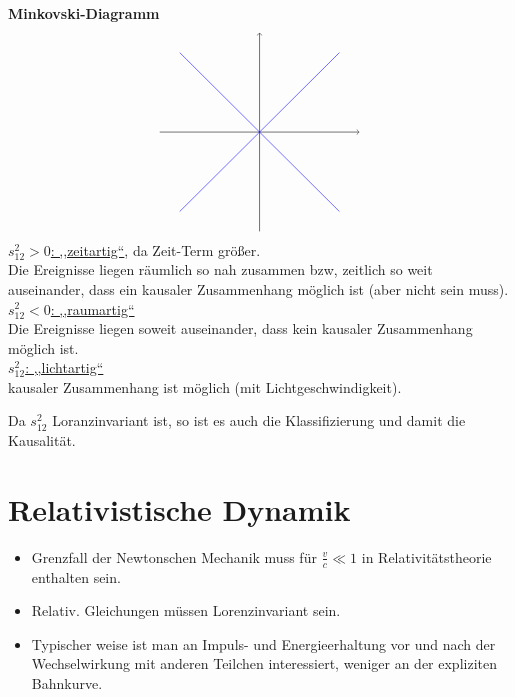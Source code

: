\documentclass[titlepage,12pt,a4paper,ngerman]{report}
\newcommand{\rbox}[1]{\begin{tcolorbox}[colback=white,colframe=red!75!black]#1\end{tcolorbox}} %
\begin{document}
{%

\textbf{Minkovski-Diagramm}\\
$$
\begin{tikzpicture}
\draw[->] (0,-2.5) -- (0,2.5);
\draw[->] (-2.5,0) -- (2.5,0);
\draw[draw=blue] (-2,-2) -- (2,2);
\draw[draw=blue] (-2,2) --(2,-2);
\end{tikzpicture}
$$
\underline{$ s_{12}^2>0 $: ,,zeitartig``}, da Zeit-Term größer.\\
Die Ereignisse liegen räumlich so nah zusammen bzw, zeitlich so weit auseinander, dass ein kausaler Zusammenhang möglich ist (aber nicht sein muss).\\[5pt]
\underline{$ s_{12}^2 < 0 $: ,,raumartig``}\\
Die Ereignisse liegen soweit auseinander, dass kein kausaler Zusammenhang möglich ist.\\[5pt]
\underline{$ s_{12}^2 $: ,,lichtartig``}\\
kausaler Zusammenhang ist möglich (mit Lichtgeschwindigkeit).
\rbox{Da $ s_{12}^2 $ Loranzinvariant ist, so ist es auch die Klassifizierung und damit die Kausalität.}

\section{Relativistische Dynamik}
\begin{itemize}
	\item Grenzfall der Newtonschen Mechanik muss für $ \frac{v}{c} \ll 1 $ in Relativitätstheorie enthalten sein.
	\item Relativ. Gleichungen müssen Lorenzinvariant sein.
	\item Typischer weise ist man an Impuls- und Energieerhaltung vor und nach der Wechselwirkung mit anderen Teilchen interessiert, weniger an der expliziten Bahnkurve.
\end{itemize}
}
\end{document}
